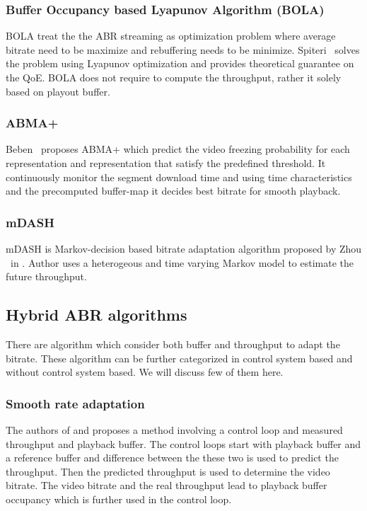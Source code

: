 \subsubsection{Buffer Occupancy based Lyapunov Algorithm (BOLA)\cite{7524428}}
BOLA\cite{7524428} treat the the ABR streaming as optimization problem where average bitrate need to be maximize and rebuffering needs to be minimize. Spiteri \etal\ solves the problem using Lyapunov optimization and provides theoretical guarantee on the QoE. BOLA does not require to compute the throughput, rather it solely based on playout buffer.

\subsubsection{ABMA+\cite{10.1145/2910017.2910596}}
Beben \etal\ proposes ABMA+\cite{10.1145/2910017.2910596} which predict the video freezing probability for each representation and representation that satisfy the predefined threshold. It continuously monitor the segment download time and using time characteristics and the precomputed buffer-map it decides best bitrate for smooth playback.

\subsubsection{mDASH\cite{7393865}}
mDASH is Markov-decision based bitrate adaptation algorithm proposed by Zhou \etal\ in \cite{7393865}. Author uses a heterogeous and time varying Markov model to estimate the future throughput. 

\subsection{Hybrid ABR algorithms}
There are algorithm which consider both buffer and throughput to adapt the bitrate. These algorithm can be further categorized in control system based and without control system based. We will discuss few of them here.

\subsubsection{Smooth rate adaptation\cite{10.1145/2413176.2413190,6694183}}
The authors of \cite{10.1145/2413176.2413190} and \cite{6694183} proposes a method involving a control loop and measured throughput and playback buffer. The control loops start with playback buffer and a reference buffer and difference between the these two is used to predict the throughput. Then the predicted throughput is used to determine the video bitrate. The video bitrate and the real throughput lead to playback buffer occupancy which is further used in the control loop.

